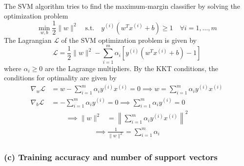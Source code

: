The SVM algorithm tries to find the maximum-margin classifier by solving the optimization problem
\begin{equation*}
    \min_{w, b} \frac{1}{2} \| w \|^{2}
    \quad \text{s.t.} \quad
    y^{(i)} \left( w^{T} x^{(i)} + b \right) \geq 1
    \quad
    \forall i = 1, \ldots, m
\end{equation*}
The Lagrangian \( \mathcal{L} \) of the SVM optimization problem is given by
\begin{equation*}
    \mathcal{L} = \frac{1}{2} \| w \|^{2} - \sum_{i=1}^{m} \alpha_{i} \left[ y^{(i)} \left( w^{T} x^{(i)} + b \right) - 1 \right]
\end{equation*}
where \( \alpha_{i} \geq 0 \) are the Lagrange multipliers.
By the KKT conditions, the conditions for optimality are given by
\begin{align*}
    \nabla_{w} \mathcal{L}
     & =
    w - \sum_{i=1}^{m} \alpha_{i} y^{(i)} x^{(i)} = 0
    \implies
    w = \sum_{i=1}^{m} \alpha_{i} y^{(i)} x^{(i)}
    \\
    \nabla_{b} \mathcal{L}
     & =
    - \sum_{i=1}^{m} \alpha_{i} y^{(i)} = 0
    \implies
    \sum_{i=1}^{m} \alpha_{i} y^{(i)} = 0
\end{align*}
\begin{align*}
    \implies
    \lVert w \rVert^{2}
     & =
    \left\lVert \sum_{i=1}^{m} \alpha_{i} y^{(i)} x^{(i)} \right\rVert^{2}
\end{align*}
\begin{align*}
    \implies
    \frac{1}{\lVert w \rVert^{2}}
    =
    \sum_{i=1}^{m} \alpha_{i}
\end{align*}

\subsubsection*{(c) Training accuracy and number of support vectors}
